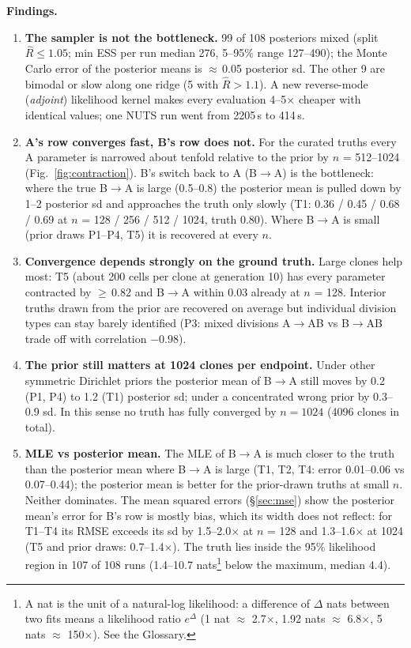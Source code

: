 \documentclass[10pt,a4paper]{article}
\newcommand{\BA}{B$\to$A}
\begin{document}
\textbf{Findings.}
\begin{enumerate}
\item \textbf{The sampler is not the bottleneck.} 99 of 108 posteriors mixed (split $\hat R \le 1.05$; min ESS per run median 276, 5--95\% range 127--490); the Monte Carlo error of the posterior means is $\approx$\,0.05 posterior sd. The other 9 are bimodal or slow along one ridge (5 with $\hat R > 1.1$). A new reverse-mode (\emph{adjoint}) likelihood kernel makes every evaluation 4--5$\times$ cheaper with identical values; one NUTS run went from 2205\,s to 414\,s.
\item \textbf{A's row converges fast, B's row does not.} For the curated truths every A parameter is narrowed about tenfold relative to the prior by $n$ = 512--1024 (Fig.~\ref{fig:contraction}). B's switch back to A (\BA) is the bottleneck: where the true \BA{} is large (0.5--0.8) the posterior mean is pulled down by 1--2 posterior sd and approaches the truth only slowly (T1: 0.36 / 0.45 / 0.68 / 0.69 at $n$ = 128 / 256 / 512 / 1024, truth 0.80). Where \BA{} is small (prior draws P1--P4, T5) it is recovered at every $n$.
\item \textbf{Convergence depends strongly on the ground truth.} Large clones help most: T5 (about 200 cells per clone at generation 10) has every parameter contracted by $\ge$\,0.82 and \BA{} within 0.03 already at $n$ = 128. Interior truths drawn from the prior are recovered on average but individual division types can stay barely identified (P3: mixed divisions A$\to$AB vs B$\to$AB trade off with correlation $-0.98$).
\item \textbf{The prior still matters at 1024 clones per endpoint.} Under other symmetric Dirichlet priors the posterior mean of \BA{} still moves by 0.2 (P1, P4) to 1.2 (T1) posterior sd; under a concentrated wrong prior by 0.3--0.9 sd. In this sense no truth has fully converged by $n = 1024$ (4096 clones in total).
\item \textbf{MLE vs posterior mean.} The MLE of \BA{} is much closer to the truth than the posterior mean where \BA{} is large (T1, T2, T4: error 0.01--0.06 vs 0.07--0.44); the posterior mean is better for the prior-drawn truths at small $n$. Neither dominates. The mean squared errors (\S\ref{sec:mse}) show the posterior mean's error for B's row is mostly bias, which its width does not reflect: for T1--T4 its RMSE exceeds its sd by 1.5--2.0$\times$ at $n$ = 128 and 1.3--1.6$\times$ at 1024 (T5 and prior draws: 0.7--1.4$\times$). The truth lies inside the 95\% likelihood region in 107 of 108 runs (1.4--10.7 nats\footnote{A nat is the unit of a natural-log likelihood: a difference of $\Delta$ nats between two fits means a likelihood ratio $e^{\Delta}$ (1 nat $\approx$ 2.7$\times$, 1.92 nats $\approx$ 6.8$\times$, 5 nats $\approx$ 150$\times$). See the Glossary.} below the maximum, median 4.4).

\end{enumerate}
\end{document}
